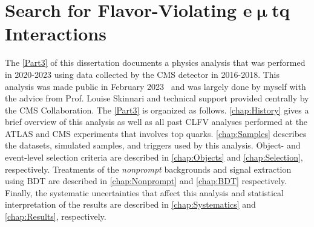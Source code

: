 \part{Search for Flavor-Violating e$\bm{\upmu}$tq Interactions}
\label{Part3}
The \autoref{Part3} of this dissertation documents a physics analysis that was performed in 2020-2023 using data collected by the \ac{CMS} detector in 2016-2018. This analysis was made public in February 2023~\cite{CMS:2023phe} and was largely done by myself with the advice from Prof. Louise Skinnari and technical support provided centrally by the \ac{CMS} Collaboration. The \autoref{Part3} is organized as follows. \autoref{chap:History} gives a brief overview of this analysis as well as all past \ac{CLFV} analyses performed at the \ac{ATLAS} and \ac{CMS} experiments that involves top quarks. \autoref{chap:Samples} describes the datasets, simulated samples, and triggers used by this analysis. Object- and event-level selection criteria are described in \autoref{chap:Objects} and \autoref{chap:Selection}, respectively. Treatments of the \emph{nonprompt} backgrounds and signal extraction using \ac{BDT} are described in \autoref{chap:Nonprompt} and \autoref{chap:BDT} respectively. Finally, the systematic uncertainties that affect this analysis and statistical interpretation of the results are described in \autoref{chap:Systematics} and \autoref{chap:Results}, respectively.








